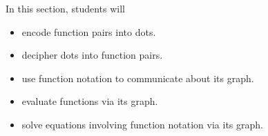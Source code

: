 \documentclass{ximera}
\begin{document}
\begin{sectionOutcomes}
In this section, students will 

\begin{itemize}
\item encode function pairs into dots.
\item decipher dots into function pairs.
\item use function notation to communicate about its graph.
\item evaluate functions via its graph.
\item solve equations involving function notation via its graph.
\end{itemize}
\end{sectionOutcomes}
\end{document}
